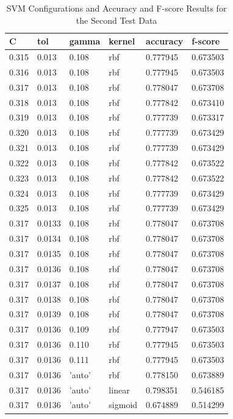 \documentclass[conference]{IEEEtran}
\begin{document}
\begin{table}[H]
	\centering
	\caption{SVM Configurations and Accuracy and F-score Results for the Second Test Data}
	\label{AllArches}
	\begin{tabular}{|l|l|l|l|l|l|}
		\hline
		C
		& tol
		& gamma
		& kernel
		& accuracy
		& f-score\\ \hline
		0.315 & 0.013 & 0.108 & rbf & 0.777945 & 0.673503\\ \hline
		0.316 & 0.013 & 0.108 & rbf & 0.777945 & 0.673503\\ \hline
		0.317 & 0.013 & 0.108 & rbf & 0.778047 & 0.673708\\ \hline
		0.318 & 0.013 & 0.108 & rbf & 0.777842 & 0.673410\\ \hline
		0.319 & 0.013 & 0.108 & rbf & 0.777739 & 0.673317\\ \hline
		0.320 & 0.013 & 0.108 & rbf & 0.777739 & 0.673429\\ \hline
		0.321 & 0.013 & 0.108 & rbf & 0.777739 & 0.673429\\ \hline
		0.322 & 0.013 & 0.108 & rbf & 0.777842 & 0.673522\\ \hline
		0.323 & 0.013 & 0.108 & rbf & 0.777842 & 0.673522\\ \hline
		0.324 & 0.013 & 0.108 & rbf & 0.777739 & 0.673429\\ \hline
		0.325 & 0.013 & 0.108 & rbf & 0.777739 & 0.673429\\ \hline
		0.317 & 0.0133 & 0.108 & rbf & 0.778047 & 0.673708\\ \hline
		0.317 & 0.0134 & 0.108 & rbf & 0.778047 & 0.673708\\ \hline
		0.317 & 0.0135 & 0.108 & rbf & 0.778047 & 0.673708\\ \hline
		0.317 & 0.0136 & 0.108 & rbf & 0.778047 & 0.673708\\ \hline
		0.317 & 0.0137 & 0.108 & rbf & 0.778047 & 0.673708\\ \hline 
		0.317 & 0.0138 & 0.108 & rbf & 0.778047 & 0.673708\\ \hline
		0.317 & 0.0139 & 0.108 & rbf & 0.778047 & 0.673708\\ \hline 
		0.317 & 0.0136 & 0.109 & rbf & 0.777947 & 0.673503\\ \hline
		0.317 & 0.0136 & 0.110 & rbf & 0.777945 & 0.673503\\ \hline
		0.317 & 0.0136 & 0.111 & rbf & 0.777945 & 0.673503\\ \hline
		0.317 & 0.0136 & 'auto' & rbf & 0.778150 & \cellcolor{green!25}0.673889\\ \hline
		0.317 & 0.0136 & 'auto' & linear & \cellcolor{green!25}0.798351 & 0.546185\\ \hline
		0.317 & 0.0136 & 'auto' & sigmoid & 0.674889 & 0.514299\\ \hline
	\end{tabular}
\end{table}
\end{document}
